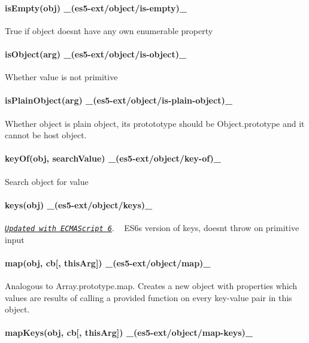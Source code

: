 \paragraph*{is\+Empty(obj) \+\_\+(es5-\/ext/object/is-\/empty)\+\_\+}

True if object doesn\textquotesingle{}t have any own enumerable property

\paragraph*{is\+Object(arg) \+\_\+(es5-\/ext/object/is-\/object)\+\_\+}

Whether value is not primitive

\paragraph*{is\+Plain\+Object(arg) \+\_\+(es5-\/ext/object/is-\/plain-\/object)\+\_\+}

Whether object is plain object, its protototype should be Object.\+prototype and it cannot be host object.

\paragraph*{key\+Of(obj, search\+Value) \+\_\+(es5-\/ext/object/key-\/of)\+\_\+}

Search object for value

\paragraph*{keys(obj) \+\_\+(es5-\/ext/object/keys)\+\_\+}

\href{http://people.mozilla.org/~jorendorff/es6-draft.html#sec-object.keys}{\tt {\itshape Updated with E\+C\+M\+A\+Script 6}}. ~\newline
E\+S6\textquotesingle{}s version of {\ttfamily keys}, doesn\textquotesingle{}t throw on primitive input

\paragraph*{map(obj, cb\mbox{[}, this\+Arg\mbox{]}) \+\_\+(es5-\/ext/object/map)\+\_\+}

Analogous to Array.\+prototype.\+map. Creates a new object with properties which values are results of calling a provided function on every key-\/value pair in this object.

\paragraph*{map\+Keys(obj, cb\mbox{[}, this\+Arg\mbox{]}) \+\_\+(es5-\/ext/object/map-\/keys)\+\_\+}

